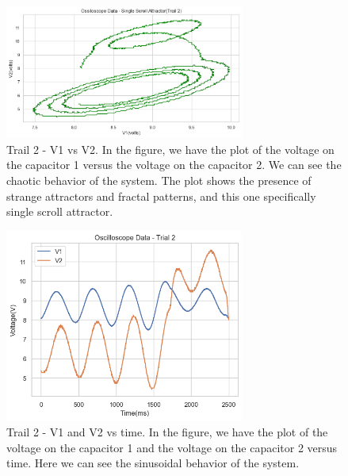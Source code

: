 \documentclass[12pt]{article}
\begin{document}
        \begin{figure}[!htb]
                \centering
                \includegraphics[width=0.7\textwidth]{./img/plots/Trial2_VonV.png}
                \caption{Trail 2 - V1 vs V2. In the figure, we have the plot of the voltage on the capacitor 1 versus the voltage on the capacitor 2. 
                We can see the chaotic behavior of the system. The plot shows the presence of strange attractors and fractal patterns, and this one specifically single scroll attractor.}
                \label{fig: Trail 2 - V on V.}
        \end{figure} \pagebreak
        \begin{figure}[!htb]
                \centering
                \includegraphics[width=0.7\textwidth]{./img/plots/Trail2_O.png}
                \caption{Trail 2 - V1 and V2 vs time. In the figure, we have the plot of the voltage on the capacitor 1 and the voltage on the capacitor 2 versus time. 
                Here we can see the sinusoidal behavior of the system. }
        \end{figure}
\end{document}
